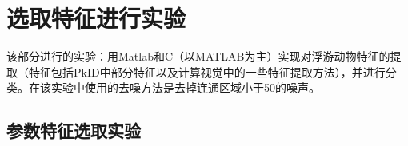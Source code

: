 \section{选取特征进行实验}
该部分进行的实验：用Matlab和C（以MATLAB为主）实现对浮游动物特征的提取（特征包括PkID中部分特征以及计算视觉中的一些特征提取方法），并进行分类。在该实验中使用的去噪方法是去掉连通区域小于50的噪声。

%
\subsection{参数特征选取实验}
